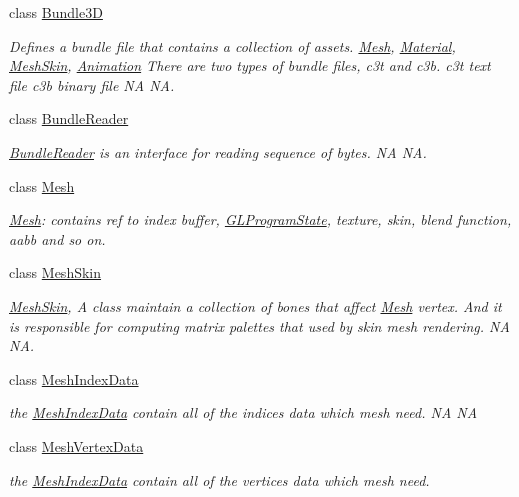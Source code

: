 \begin{DoxyCompactItemize}
class \hyperlink{classBundle3D}{Bundle3D}
\begin{DoxyCompactList}\small\item\em Defines a bundle file that contains a collection of assets. \hyperlink{classMesh}{Mesh}, \hyperlink{classMaterial}{Material}, \hyperlink{classMeshSkin}{Mesh\+Skin}, \hyperlink{classAnimation}{Animation} There are two types of bundle files, c3t and c3b. c3t text file c3b binary file  NA  NA. \end{DoxyCompactList}\item 
class \hyperlink{classBundleReader}{Bundle\+Reader}
\begin{DoxyCompactList}\small\item\em \hyperlink{classBundleReader}{Bundle\+Reader} is an interface for reading sequence of bytes.  NA  NA. \end{DoxyCompactList}\item 
class \hyperlink{classMesh}{Mesh}
\begin{DoxyCompactList}\small\item\em \hyperlink{classMesh}{Mesh}\+: contains ref to index buffer, \hyperlink{classGLProgramState}{G\+L\+Program\+State}, texture, skin, blend function, aabb and so on. \end{DoxyCompactList}\item 
class \hyperlink{classMeshSkin}{Mesh\+Skin}
\begin{DoxyCompactList}\small\item\em \hyperlink{classMeshSkin}{Mesh\+Skin}, A class maintain a collection of bones that affect \hyperlink{classMesh}{Mesh} vertex. And it is responsible for computing matrix palettes that used by skin mesh rendering.  NA  NA. \end{DoxyCompactList}\item 
class \hyperlink{classMeshIndexData}{Mesh\+Index\+Data}
\begin{DoxyCompactList}\small\item\em the \hyperlink{classMeshIndexData}{Mesh\+Index\+Data} contain all of the indices data which mesh need.  NA  NA \end{DoxyCompactList}\item 
class \hyperlink{classMeshVertexData}{Mesh\+Vertex\+Data}
\begin{DoxyCompactList}\small\item\em the \hyperlink{classMeshIndexData}{Mesh\+Index\+Data} contain all of the vertices data which mesh need. \end{DoxyCompactList}\item 

\end{DoxyCompactItemize}
